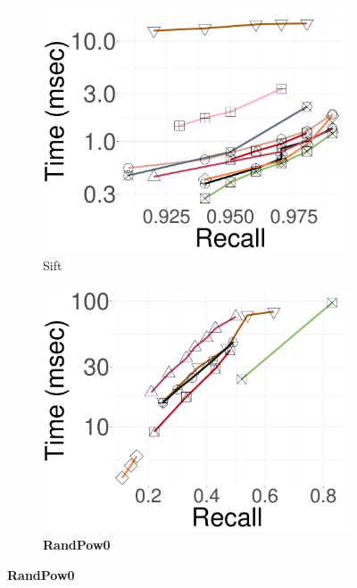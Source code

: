 \begin{figure}[!htb]
\begin{minipage}{\textwidth}
		\begin{subfigure}{\soneM\textwidth}
  \centering
			\includegraphics[width=\textwidth]{../img/Experiments/search/25/sift_10nn.pdf}
			\caption{Sift}  
			\label{fig:elpis:query:performance:25GB:sift:10NN}
		\end{subfigure}
   \hspace{0.4cm}
	\begin{subfigure}{\soneM\textwidth}
 \centering
		\includegraphics[width=\textwidth]{../img/Experiments/search/25/pow1_10nn.pdf}
		\caption{\textbf{RandPow0}} 
		\label{fig:query:performance:25GB:rand:pow1:10NN}
	\end{subfigure}

\end{minipage}
\end{figure}
